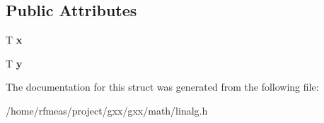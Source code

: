 \subsection*{Public Attributes}
\begin{DoxyCompactItemize}
\item 
T {\bfseries x}\hypertarget{structlinalg_1_1vec_3_01T_00_012_01_4_a430a33c183fcf2f10a09505133514874}{}\label{structlinalg_1_1vec_3_01T_00_012_01_4_a430a33c183fcf2f10a09505133514874}

\item 
T {\bfseries y}\hypertarget{structlinalg_1_1vec_3_01T_00_012_01_4_aa87aeae42dc7cfbc4a9c6683b7d19f6a}{}\label{structlinalg_1_1vec_3_01T_00_012_01_4_aa87aeae42dc7cfbc4a9c6683b7d19f6a}

\end{DoxyCompactItemize}


The documentation for this struct was generated from the following file\+:\begin{DoxyCompactItemize}
\item 
/home/rfmeas/project/gxx/gxx/math/linalg.\+h\end{DoxyCompactItemize}

